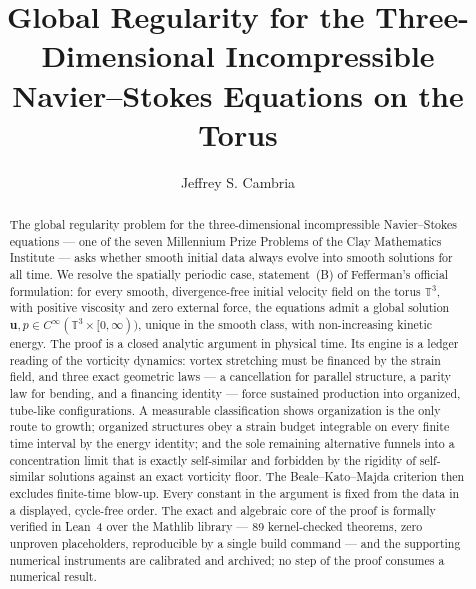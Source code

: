 \documentclass[11pt,letterpaper]{amsart}
\theoremstyle{definition}
\theoremstyle{remark}
\newcommand{\TT}{\mathbb{T}}
\newcommand{\uu}{\boldsymbol{u}}
\begin{document}
\title[Global regularity for Navier--Stokes on the torus]{Global Regularity for the
Three-Dimensional Incompressible Navier--Stokes Equations on the Torus}

\author{Jeffrey S. Cambria}

\vspace*{-3pc}
\begin{abstract}
The global regularity problem for the three-dimensional incompressible Navier--Stokes
equations --- one of the seven Millennium Prize Problems of the Clay Mathematics
Institute --- asks whether smooth initial data always evolve into smooth solutions for
all time. We resolve the spatially periodic case, statement~(B) of Fefferman's official
formulation: for every smooth, divergence-free initial velocity field on the torus
$\TT^3$, with positive viscosity and zero external force, the equations admit a global
solution $\uu, p\in C^\infty(\TT^3\times[0,\infty))$, unique in the smooth class, with
non-increasing kinetic energy. The proof is a closed analytic argument in physical
time. Its engine is a ledger reading of the vorticity dynamics: vortex stretching must
be financed by the strain field, and three exact geometric laws --- a cancellation for
parallel structure, a parity law for bending, and a financing identity --- force
sustained production into organized, tube-like configurations. A measurable
classification shows organization is the only route to growth; organized structures
obey a strain budget integrable on every finite time interval by the energy identity;
and the sole remaining alternative funnels into a concentration limit that is
exactly self-similar and forbidden by the rigidity of self-similar solutions
against an exact vorticity floor. The Beale--Kato--Majda criterion
then excludes finite-time blow-up. Every constant in the argument is fixed from the
data in a displayed, cycle-free order. The exact and algebraic core of the proof is
formally verified in Lean~4 over the Mathlib library --- 89 kernel-checked theorems,
zero unproven placeholders, reproducible by a single build command --- and the
supporting numerical instruments are calibrated and archived; no step of the proof
consumes a numerical result.
\end{abstract}

\maketitle
{\renewcommand{\thefootnote}{\fnsymbol{footnote}}%
}
\end{document}

